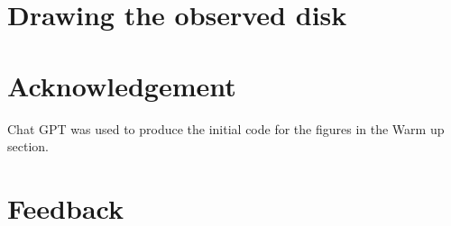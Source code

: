 \documentclass[10pt, a4paper]{article}
\begin{document}
\section{Drawing the observed disk}

\section{Acknowledgement}

Chat GPT was used to produce the initial code for the figures in the Warm up section.

\section{Feedback}

\makereferences


\end{document}
